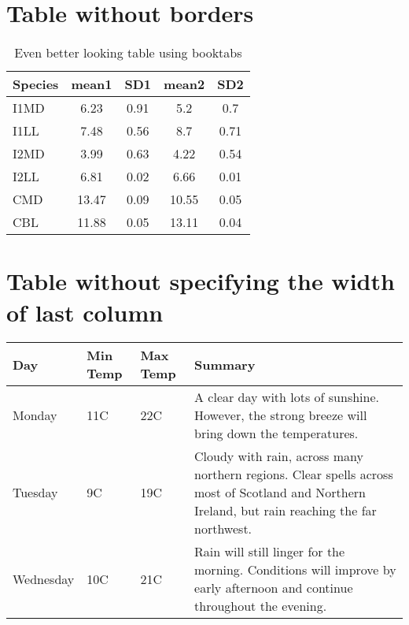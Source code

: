 \documentclass{article}
\begin{document}
\section{Table without borders}

\begin{table}[h]
\caption{Even better looking table using booktabs}
\centering
\label{table:goodtable}
\begin{tabular}{l c c c c}
\toprule
Species  & mean1 & SD1  & mean2 & SD2  \\ 
\midrule
I1MD & 6.23 & 0.91 & 5.2  & 0.7  \\

I1LL & 7.48 & 0.56 & 8.7  & 0.71 \\

I2MD & 3.99 & 0.63 & 4.22 & 0.54 \\

I2LL & 6.81 & 0.02 & 6.66 & 0.01 \\

CMD & 13.47 & 0.09 & 10.55 & 0.05 \\

CBL & 11.88 & 0.05 & 13.11 & 0.04\\ 
\bottomrule
\end{tabular}
\end{table}


\section{Table without specifying the width of last column}

\begin{table}[h]
\begin{tabularx}{\textwidth}{ l  l  l  X }
\toprule
Day & Min Temp & Max Temp & Summary \\ \midrule
Monday & 11C & 22C & A clear day with lots of sunshine.
However, the strong breeze will bring down the temperatures. \\ 
Tuesday & 9C & 19C & Cloudy with rain, across many northern regions. Clear 
                     spells across most of Scotland and Northern Ireland, but 
                     rain reaching the far northwest. \\ 
Wednesday & 10C & 21C & Rain will still linger for the morning. Conditions    
                        will improve by early afternoon and continue throughout 
                        the evening. \\
\bottomrule
\end{tabularx}
\end{table}
\end{document}

